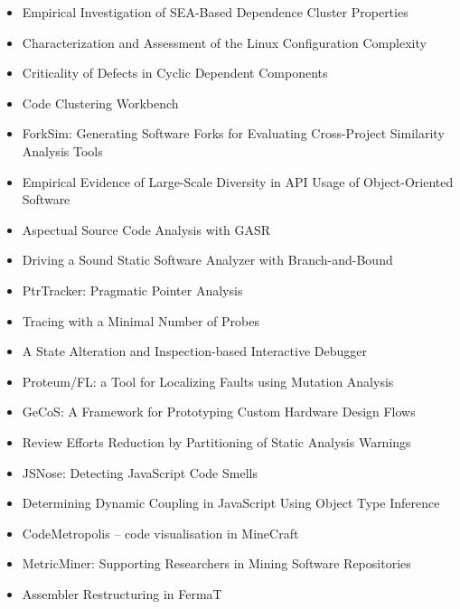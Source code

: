 {\small
\begin{itemize}[itemsep=-1ex]
  \item Empirical Investigation of SEA-Based Dependence Cluster Properties
  \item Characterization and Assessment of the Linux Configuration Complexity
  \item Criticality of Defects in Cyclic Dependent Components
  \item Code Clustering Workbench {\color{blue} \checkmark}{\color{red} \texttimes}
  \item ForkSim: Generating Software Forks for Evaluating Cross-Project Similarity Analysis Tools
  \item Empirical Evidence of Large-Scale Diversity in API Usage of Object-Oriented Software {\color{blue} \checkmark}{\color{red} \texttimes}
  \item Aspectual Source Code Analysis with GASR {\color{blue} \checkmark}{\color{red} \texttimes}
  \item Driving a Sound Static Software Analyzer with Branch-and-Bound {\color{blue} \checkmark}{\color{red} \texttimes}
  \item PtrTracker: Pragmatic Pointer Analysis {\color{blue} \checkmark}{\color{red} \texttimes}
  \item Tracing with a Minimal Number of Probes
  \item A State Alteration and Inspection-based Interactive Debugger {\color{blue} \checkmark}{\color{red} \texttimes}
  \item Proteum/FL: a Tool for Localizing Faults using Mutation Analysis
  \item GeCoS: A Framework for Prototyping Custom Hardware Design Flows {\color{blue} \checkmark}{\color{red} \texttimes}
  \item Review Efforts Reduction by Partitioning of Static Analysis Warnings {\color{blue} \checkmark}{\color{red} \texttimes}
  \item JSNose: Detecting JavaScript Code Smells {\color{blue} \checkmark}{\color{red} \texttimes}
  \item Determining Dynamic Coupling in JavaScript Using Object Type Inference {\color{blue} \checkmark}{\color{red} \texttimes}
  \item CodeMetropolis – code visualisation in MineCraft
  \item MetricMiner: Supporting Researchers in Mining Software Repositories
  \item Assembler Restructuring in FermaT {\color{blue} \checkmark}{\color{red} \texttimes}

\end{itemize}}
